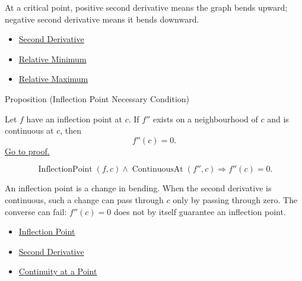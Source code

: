 \begin{remark*}[Interpretation]
At a critical point, positive second derivative means the graph bends upward; negative second derivative means it bends downward.
\end{remark*}

\begin{dependencies}
\begin{itemize}
  \item \hyperref[def:second-derivative]{Second Derivative}
  \item \hyperref[def:relative-minimum]{Relative Minimum}
  \item \hyperref[def:relative-maximum]{Relative Maximum}
\end{itemize}
\end{dependencies}

\begin{propositionbox}{Proposition (Inflection Point Necessary Condition)}
\begin{proposition}
\label{prop:inflection-point-necessary-condition}
Let $f$ have an inflection point at $c$. If $f''$ exists on a neighbourhood of $c$ and is continuous at $c$, then
\[
  f''(c)=0.
\]
\hyperref[prf:inflection-point-necessary-condition]{Go to proof.}
\end{proposition}
\end{propositionbox}

\begin{remark*}
\[
  \operatorname{InflectionPoint}(f,c)\land \operatorname{ContinuousAt}(f'',c)
  \Longrightarrow
  f''(c)=0.
\]
\end{remark*}

\begin{remark*}[Interpretation]
An inflection point is a change in bending. When the second derivative is continuous, such a change can pass through $c$ only by passing through zero. The converse can fail: $f''(c)=0$ does not by itself guarantee an inflection point.
\end{remark*}

\begin{dependencies}
\begin{itemize}
  \item \hyperref[def:inflection-point]{Inflection Point}
  \item \hyperref[def:second-derivative]{Second Derivative}
  \item \hyperref[def:continuous-at-point]{Continuity at a Point}
\end{itemize}
\end{dependencies}
